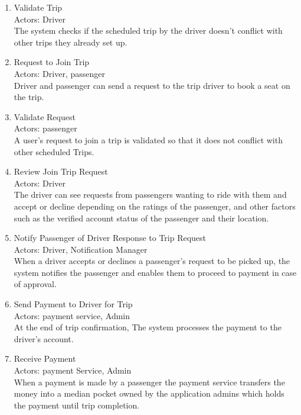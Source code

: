 \documentclass[a4paper, 12pt]{article} %
\begin{document}
\begin{enumerate}
                \item Validate Trip \\
                    Actors: Driver \\
                    The system checks if the scheduled trip by the driver doesn't conflict with other trips they already set up. 
                \item Request to Join Trip \\
                    Actors: Driver, passenger \\
                    Driver and passenger can send a request to the trip driver to book a seat on the trip.
                \item Validate Request \\
                    Actors: passenger \\ 
                    A user’s request to join a trip is validated so that it does not conflict with other scheduled Trips.
                \item Review Join Trip Request \\
                    Actors: Driver \\
                    The driver can see requests from passengers wanting to ride with them and accept or decline depending on the ratings of the passenger, and other factors such as the verified account status of the passenger and their location. 
                \item Notify Passenger of Driver Response to Trip Request\\
                    Actors: Driver, Notification Manager\\
                    When a driver accepts or declines a passenger’s request to be picked up, the system notifies the passenger and enables them to proceed to payment in case of approval.
                \item Send Payment to Driver for Trip\\
                    Actors: payment service, Admin\\
                    At the end of trip confirmation, The system processes the payment to the driver's account.
                \item Receive Payment\\
                    Actors: payment Service, Admin\\
                    When a payment is made by a passenger the payment service transfers the money into a median pocket owned by the application admins which holds the payment until trip completion.

\end{enumerate}
\end{document}
